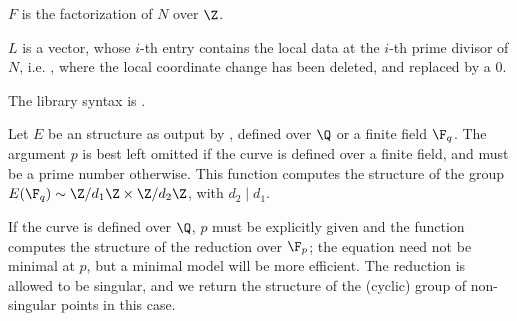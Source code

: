 \item $F$ is the factorization of $N$ over $\Z$.

\item $L$ is a vector, whose $i$-th entry contains the local data
at the $i$-th prime divisor of $N$, i.e. ,
where the local coordinate change has been deleted, and replaced by a $0$.

The library syntax is .

\label{se:ellgroup}
Let $E$ be an  structure as output by , defined over
$\Q$ or a finite field $\F_q$. The argument $p$ is best left omitted if the
curve is defined over a finite field, and must be a prime number otherwise.
This function computes the structure of the group $E(\F_q) \sim \Z/d_1\Z
\times \Z/d_2\Z$, with $d_2\mid d_1$.

If the curve is defined over $\Q$, $p$ must be explicitly given and the
function computes the structure of the reduction over $\F_p$; the
equation need not be minimal at $p$, but a minimal model will be more
efficient. The reduction is allowed to be singular, and we return the
structure of the (cyclic) group of non-singular points in this case.

